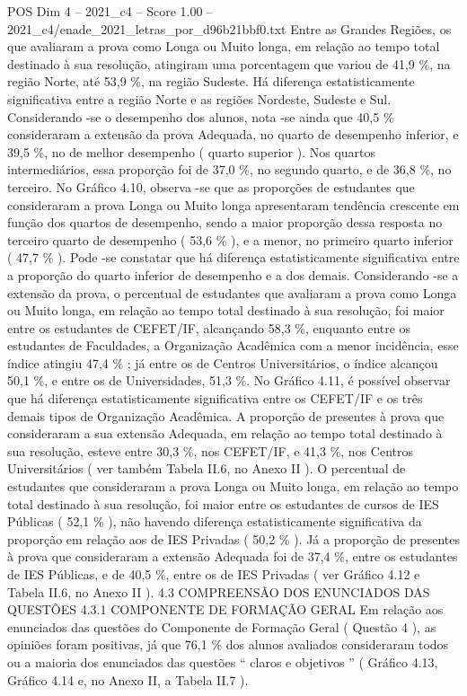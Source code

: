 \begin{textsample}{POS Dim 4 – 2021\_c4 – Score 1.00 – 2021\_c4/enade\_2021\_letras\_por\_d96b21bbf0.txt}
Entre as Grandes Regiões, os que avaliaram a prova como Longa ou Muito longa, em relação ao tempo total destinado à sua resolução, atingiram uma porcentagem que variou de 41,9 \%, na região Norte, até 53,9 \%, na região Sudeste.
Há diferença estatisticamente significativa entre a região Norte e as regiões Nordeste, Sudeste e Sul.
Considerando -se o desempenho dos alunos, nota -se ainda que 40,5 \% consideraram a extensão da prova Adequada, no quarto de desempenho inferior, e 39,5 \%, no de melhor desempenho ( quarto superior ).
Nos quartos intermediários, essa proporção foi de 37,0 \%, no segundo quarto, e de 36,8 \%, no terceiro.
No Gráfico 4.10, observa -se que as proporções de estudantes que consideraram a prova Longa ou Muito longa apresentaram tendência crescente em função dos quartos de desempenho, sendo a maior proporção dessa resposta no terceiro quarto de desempenho ( 53,6 \% ), e a menor, no primeiro quarto inferior ( 47,7 \% ).
Pode -se constatar que há diferença estatisticamente significativa entre a proporção do quarto inferior de desempenho e a dos demais.
Considerando -se a extensão da prova, o percentual de estudantes que avaliaram a prova como Longa ou Muito longa, em relação ao tempo total destinado à sua resolução, foi maior entre os estudantes de CEFET/IF, alcançando 58,3 \%, enquanto entre os estudantes de Faculdades, a Organização Acadêmica com a menor incidência, esse índice atingiu 47,4 \% ; já entre os de Centros Universitários, o índice alcançou 50,1 \%, e entre os de Universidades, 51,3 \%.
No Gráfico 4.11, é possível observar que há diferença estatisticamente significativa entre os CEFET/IF e os três demais tipos de Organização Acadêmica.
A proporção de presentes à prova que consideraram a sua extensão Adequada, em relação ao tempo total destinado à sua resolução, esteve entre 30,3 \%, nos CEFET/IF, e 41,3 \%, nos Centros Universitários ( ver também Tabela II.6, no Anexo II ).
O percentual de estudantes que consideraram a prova Longa ou Muito longa, em relação ao tempo total destinado à sua resolução, foi maior entre os estudantes de cursos de IES Públicas ( 52,1 \% ), não havendo diferença estatisticamente significativa da proporção em relação aos de IES Privadas ( 50,2 \% ).
Já a proporção de presentes à prova que consideraram a extensão Adequada foi de 37,4 \%, entre os estudantes de IES Públicas, e de 40,5 \%, entre os de IES Privadas ( ver Gráfico 4.12 e Tabela II.6, no Anexo II ). 4.3 COMPREENSÃO DOS ENUNCIADOS DAS QUESTÕES 4.3.1 COMPONENTE DE FORMAÇÃO GERAL Em relação aos enunciados das questões do Componente de Formação Geral ( Questão 4 ), as opiniões foram positivas, já que 76,1 \% dos alunos avaliados consideraram todos ou a maioria dos enunciados das questões “ claros e objetivos ” ( Gráfico 4.13, Gráfico 4.14 e, no Anexo II, a Tabela II.7 ).

\end{textsample}
